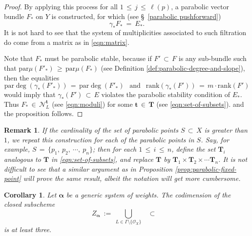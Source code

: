 \documentclass[10pt,reqno]{amsart}
\DeclareMathOperator{\Malpha}{\mc{M}^{\boldsymbol{m,\alpha}}_X(r,\ \xi)}
\DeclareMathOperator{\MLalpha}{\left(\mc{M}^{\boldsymbol{m,\alpha}}_X(r,\ \xi)\right)^L}
\newcommand{\mc}[1]{\mathcal{#1}}
\newtheorem{corollary}[theorem]{Corollary}
\theoremstyle{myroman}
\newtheorem{remark}[theorem]{Remark}
\numberwithin{equation}{section}
\begin{document}
\begin{proof}
			By applying this process for all $1\,\leq\, j\,\leq\, \ell(p)$, a parabolic vector bundle $F_*$ on $Y$
			is constructed, for which (see \S~\ref{parabolic pushforward})
			$$\gamma_* F_* \ =\ E_* .$$
			It is not hard to see that the system of multiplicities associated to such filtration do come from a matrix as in \eqref{eqn:matrix}.
			
			
			Note that $F_*$ must be parabolic stable, because if $F'\,\subset\, F$ is any sub-bundle
			such that $\text{par}\mu(F'_*)\,\geq \,\text{par}\mu(F_*)$ (see Definition \ref{def:parabolic-degree-and-slope}), then the equalities
			\[\text{par}\deg(\gamma_*(F'_*))\,=\,\text{par}\deg(F'_*)\ \ \text{ and }\ \ 
			\text{rank}(\gamma_*(F')) \,=\, m\cdot \text{rank}(F')\]
			would imply that $\gamma_*(F')\,\subset\, E$ violates the parabolic stability condition
			of $E_*$. Thus $F_*\,\in\, \mathcal{N}^\textbf{t}_L$ (see \eqref{eqn:moduli}) for
			some $\textbf{t}\,\in\, \boldsymbol{T}$ (see \eqref{eqn:set-of-subsets}).   and the proposition follows.
		\end{proof}
		
		\begin{remark}\label{rem:multipli-parabolic-points}
			If the cardinality of the set of parabolic points $S\,\subset\, X$ is greater than $1$, we repeat this
			construction for each of the parabolic points in $S$. Say, for example, $S\,=\,\{p_1,\ p_2,\ \cdots,\ p_n\}$;
			then for each $1\,\leq\, i\,\leq\, n$, define the set $\boldsymbol{T}_i$ analogous to $\boldsymbol{T}$ in
			\eqref{eqn:set-of-subsets}, and replace $\boldsymbol{T}$ by $\boldsymbol{T}_1\times\boldsymbol{T}_2
			\times\cdots\boldsymbol{T}_n$. It is not difficult to see that a similar argument as in Proposition
			\ref{prop:parabolic-fixed-point} will prove the same result, albeit the notation will get more cumbersome.
		\end{remark}
		
		\begin{corollary}\label{cor:codimension-estimate}
			Let $\boldsymbol{\alpha}$ be a generic system of weights. The codimension of the closed subscheme
			\begin{equation*}
				Z_{\boldsymbol{\alpha}}\ :=\ \underset{L\in\Gamma\setminus\{\mathcal{O}_X\}}{\bigcup}\MLalpha\
				\subset\ \Malpha
			\end{equation*}
			is at least three.
		\end{corollary}
		
\end{document}
